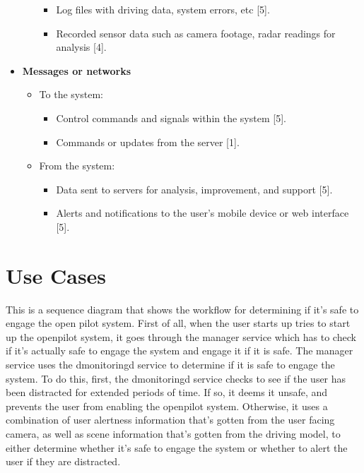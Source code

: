 \documentclass[12pt]{article}
\begin{document}
\begin{itemize}
\begin{itemize}
        \begin{itemize}
            \item[] Log files with driving data, system errors, etc [5].
            \item[] Recorded sensor data such as camera footage, radar readings for analysis [4].
 
        \end{itemize}
        
    \end{itemize}

    \item \textbf{Messages or networks}

    \begin{itemize}
        \item To the system:
        \begin{itemize}
            \item[] Control commands and signals within the system [5].
            \item[] Commands or updates from the server [1].

            
        \end{itemize}

        
        \item From the system:

        \begin{itemize}
            \item[] Data sent to servers for analysis, improvement, and support [5].
            \item[] Alerts and notifications to the user's mobile device or web interface [5].
 
        \end{itemize}
    \end{itemize}
\end{itemize}








\section{Use Cases}

This is a sequence diagram that shows the workflow for determining if it's safe to engage the open pilot system.
First of all, when the user starts up tries to start up the openpilot system, it goes through the manager service which has to check if it's actually safe to engage the system and engage it if it is safe. The manager service uses the dmonitoringd service to determine if it is safe to engage the system. To do this, first, the dmonitoringd service checks to see if the user has been distracted for extended periods of time. If so, it deems it unsafe, and prevents the user from enabling the openpilot system. Otherwise, it uses a combination of user alertness information that's gotten from the user facing camera, as well as scene information that’s gotten from the driving model, to either determine whether it's safe to engage the system or whether to alert the user if they are distracted.
\end{document}
